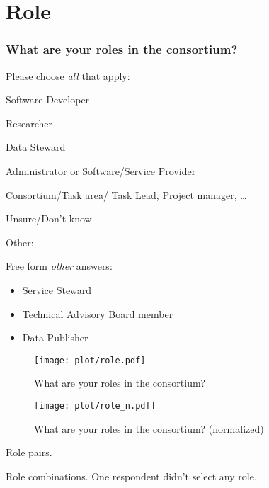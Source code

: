 \documentclass[headsepline,titlepage,twoside,12pt,toc=flat,headings=normal]{scrreprt}
\newcommand{\question}[1]{\subsubsection{#1}}
\newcommand{\otherbox}{\fbox{\phantom{This is how big an answer would be.}}}
\begin{document}
\clearpage
\section{Role}

\question{What are your roles in the consortium?}
Please choose \emph{all} that apply:

\begin{answers}
\item Software Developer
\item Researcher
\item Data Steward
\item Administrator or Software/Service Provider
\item Consortium/Task area/ Task Lead, Project manager, \ldots{}
\item Unsure/Don't know
\item Other: \otherbox
\end{answers}

Free form \emph{other} answers:
\begin{itemize}
\item Service Steward
\item Technical Advisory Board member
\item Data Publisher
\end{itemize}
\clearpage

\begin{figure}[h!]
\caption{What are your roles in the consortium?}
\label{fig:role}
\texttt{[image: plot/role.pdf]}
\end{figure}

\begin{figure}[h!]
\caption{What are your roles in the consortium? (normalized)}
\label{fig:role_n}
\texttt{[image: plot/role\_n.pdf]}
\end{figure}

\begin{table}[h!]
\caption{Role pairs.}
\label{tab:role_pairs}

\end{table}

\begin{table}[h!]
\caption[Role combinations]{Role combinations. One respondent didn't select any role.}
\label{tab:role_combinations}

\end{table}


\clearpage
\end{document}
